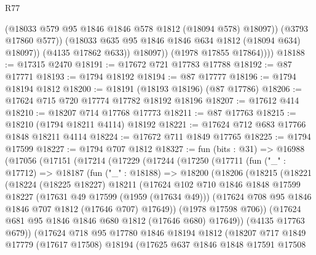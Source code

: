 \begin{lexlean}{R77}
\begin{coremodule}
                      (@18033 @579 @95 @1846 @1846 @578 @1812 (@18094 @578) @18097))
                    (@3793 @17860 @577))
                  (@18033 @635 @95 @1846 @1846 @634 @1812 (@18094 @634) @18097))
                (@4135 @17862 @633))
              @18097))
          (@1978 @17855 @17864))))
@18188 := @17315 @2470
@18191 := @17672 @721 @17783 @17788
@18192 := @87 @17771
@18193 := @1794 @18192
@18194 := @87 @17777
@18196 := @1794 @18194 @1812
@18200 := @18191 (@18193 @18196) (@87 @17786)
@18206 := @17624 @715 @720 @17774 @17782 @18192 @18196
@18207 := @17612 @414
@18210 := @18207 @714 @17768 @17773
@18211 := @87 @17763
@18215 := @18210 (@1794 @18211 @4114) @18192
@18221 := @17624 @712 @683 @17766 @1848 @18211 @4114
@18224 := @17672 @711 @1849 @17765
@18225 := @1794 @17599
@18227 := @1794 @707 @1812
@18327 := fun (bits : @31) =>
  @16988
    (@17056
      (@17151
        (@17214
          (@17229
            (@17244
              (@17250
                (@17711
                  (fun ("_" : @17712) =>
                  @18187
                    (fun ("_" : @18188) =>
                    @18200
                      (@18206
                        (@18215
                          (@18221
                            (@18224
                              (@18225 @18227)
                              @18211
                              (@17624
                                @102
                                @710
                                @1846
                                @1848
                                @17599
                                @18227
                                (@17631 @49 @17599 (@1959 (@17634 @49)))
                                (@17624 @708 @95 @1846 @1846 @707 @1812 (@17646 @707) @17649))
                              (@1978 @17598 @706))
                            (@17624 @681 @95 @1846 @1846 @680 @1812 (@17646 @680) @17649))
                          (@4135 @17763 @679))
                        (@17624
                          @718
                          @95
                          @17780
                          @1846
                          @18194
                          @1812
                          (@18207
                            @717
                            @1849
                            @17779
                            (@17617 @17508)
                            @18194
                            (@17625
                              @637
                              @1846
                              @1848
                              @17591
                              @17508

\end{coremodule}
\end{lexlean}
